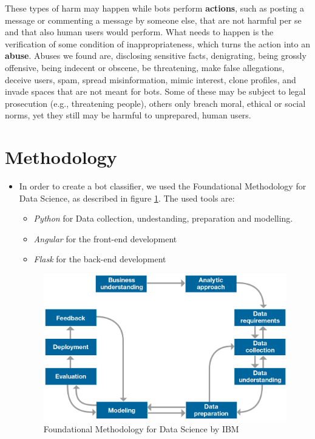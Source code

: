 These types of harm may happen while bots perform  \textbf{actions}, such as posting a message or commenting a message by someone else, that are not harmful per se and that also human users would perform. What needs to happen is the verification of some condition of inappropriateness, which turns the action into an \textbf{abuse}. Abuses we found are, disclosing sensitive facts, denigrating, being grossly offensive, being indecent or obscene, be threatening, make false allegations, deceive users, spam, spread misinformation, mimic interest, clone profiles, and invade spaces that are not meant for bots. Some of these may be subject to legal prosecution (e.g., threatening people), others only breach moral, ethical or social norms, yet they still may be harmful to unprepared, human users.


\section{Methodology}


\begin{itemize}
\item[\PencilRight] In order to create a bot classifier, we used the Foundational Methodology for Data Science, as described in figure \ref{fig:methodology}. The used tools are:

\begin{itemize}
	\item[\PencilRight] \emph{Python} for Data collection, undestanding, preparation and modelling.
	\item[\PencilRight] \emph{Angular} for the front-end development
	\item[\PencilRight] \emph{Flask} for the back-end development
\end{itemize}

\begin{figure}
	\includegraphics[width=\linewidth]{chapter1/figure/methodology.jpg}
	\caption{Foundational Methodology for Data Science by IBM}
	\label{fig:methodology}
\end{figure}

\end{itemize}



